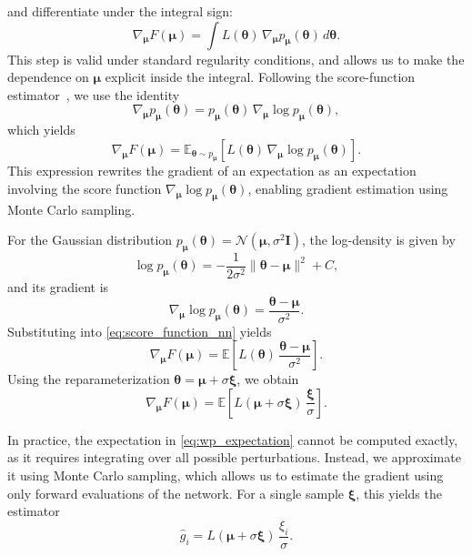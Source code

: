 and differentiate under the integral sign:
\[
\nabla_{\boldsymbol{\mu}} F(\boldsymbol{\mu})
=
\int L(\boldsymbol{\theta})\, \nabla_{\boldsymbol{\mu}} p_{\boldsymbol{\mu}}(\boldsymbol{\theta})\, d\boldsymbol{\theta}.
\]
This step is valid under standard regularity conditions, and allows us to make the dependence on $\boldsymbol{\mu}$ explicit inside the integral. Following the score-function estimator~\parencite{williams_simple_1992}, we use the identity
\[
\nabla_{\boldsymbol{\mu}} p_{\boldsymbol{\mu}}(\boldsymbol{\theta})
=
p_{\boldsymbol{\mu}}(\boldsymbol{\theta})\, \nabla_{\boldsymbol{\mu}} \log p_{\boldsymbol{\mu}}(\boldsymbol{\theta}),
\]
which yields
\begin{equation}
\nabla_{\boldsymbol{\mu}} F(\boldsymbol{\mu})
=
\mathbb{E}_{\boldsymbol{\theta} \sim p_{\boldsymbol{\mu}}}
\!\left[
L(\boldsymbol{\theta})\, \nabla_{\boldsymbol{\mu}} \log p_{\boldsymbol{\mu}}(\boldsymbol{\theta})
\right].
\label{eq:score_function_nn}
\end{equation}
This expression rewrites the gradient of an expectation as an expectation involving the score function $\nabla_{\boldsymbol{\mu}} \log p_{\boldsymbol{\mu}}(\boldsymbol{\theta})$, enabling gradient estimation using Monte Carlo sampling.

For the Gaussian distribution $p_{\boldsymbol{\mu}}(\boldsymbol{\theta}) = \mathcal{N}(\boldsymbol{\mu}, \sigma^2 \mathbf{I})$,
the log-density is given by
\[
\log p_{\boldsymbol{\mu}}(\boldsymbol{\theta})
=
-\frac{1}{2\sigma^2}\|\boldsymbol{\theta} - \boldsymbol{\mu}\|^2 + C,
\]
and its gradient is
\[
\nabla_{\boldsymbol{\mu}} \log p_{\boldsymbol{\mu}}(\boldsymbol{\theta})
=
\frac{\boldsymbol{\theta} - \boldsymbol{\mu}}{\sigma^2}.
\]
Substituting into \eqref{eq:score_function_nn} yields
\[
\nabla_{\boldsymbol{\mu}} F(\boldsymbol{\mu})
=
\mathbb{E}
\!\left[
L(\boldsymbol{\theta})\, \frac{\boldsymbol{\theta} - \boldsymbol{\mu}}{\sigma^2}
\right].
\]
Using the reparameterization $\boldsymbol{\theta} = \boldsymbol{\mu} + \sigma \boldsymbol{\xi}$, we obtain
\begin{equation}
\nabla_{\boldsymbol{\mu}} F(\boldsymbol{\mu})
=
\mathbb{E}
\!\left[
L(\boldsymbol{\mu} + \sigma \boldsymbol{\xi})\, \frac{\boldsymbol{\xi}}{\sigma}
\right].
\label{eq:wp_expectation}
\end{equation}

In practice, the expectation in \eqref{eq:wp_expectation} cannot be computed exactly, as it requires integrating over all possible perturbations. Instead, we approximate it using Monte Carlo sampling, which allows us to estimate the gradient using only forward evaluations of the network. For a single sample $\boldsymbol{\xi}$, this yields the estimator
\[
\widehat{g}_i
=
L(\boldsymbol{\mu} + \sigma \boldsymbol{\xi})\, \frac{\xi_i}{\sigma}.
\]

